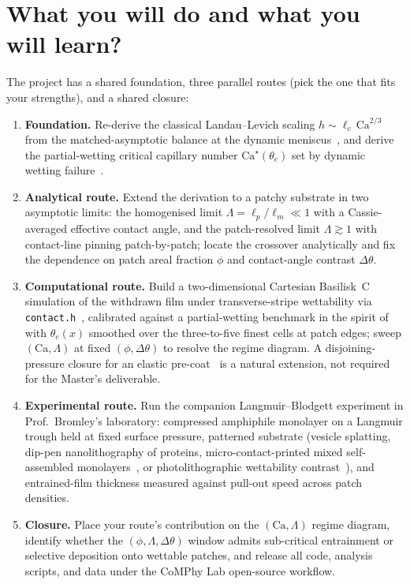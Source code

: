 \documentclass[11pt]{article}
\begin{document}
\section*{What you will do and what you will learn?}

\noindent The project has a shared foundation, three parallel routes (pick the one that fits your strengths), and a shared closure:

\begin{enumerate}
\itemsep0em
\item \textbf{Foundation.} Re-derive the classical Landau--Levich scaling $h \sim \ell_c \, \mathrm{Ca}^{2/3}$ from the matched-asymptotic balance at the dynamic meniscus~\citep{landauLevich1942,quere1999fluid}, and derive the partial-wetting critical capillary number $\mathrm{Ca}^\star(\theta_e)$ set by dynamic wetting failure~\citep{bonnWettingSpreading2009}.
\item \textbf{Analytical route.} Extend the derivation to a patchy substrate in two asymptotic limits: the homogenised limit $\Lambda = \ell_p / \ell_m \ll 1$ with a Cassie-averaged effective contact angle, and the patch-resolved limit $\Lambda \gtrsim 1$ with contact-line pinning patch-by-patch; locate the crossover analytically and fix the dependence on patch areal fraction $\phi$ and contact-angle contrast $\Delta\theta$.
\item \textbf{Computational route.} Build a two-dimensional Cartesian Basilisk~C simulation of the withdrawn film under transverse-stripe wettability via \texttt{contact.h}~\citep{popinet2015quadtree,basiliskVatsal,basiliskVatsalDropFilm}, calibrated against a partial-wetting benchmark in the spirit of~\citet{afkhami2009,afkhami2018} with $\theta_e(x)$ smoothed over the three-to-five finest cells at patch edges; sweep $(\mathrm{Ca}, \Lambda)$ at fixed $(\phi, \Delta\theta)$ to resolve the regime diagram. A disjoining-pressure closure for an elastic pre-coat~\citep{bertin2022} is a natural extension, not required for the Master's deliverable.
\item \textbf{Experimental route.} Run the companion Langmuir--Blodgett experiment in Prof.~Bromley's laboratory: compressed amphiphile monolayer on a Langmuir trough held at fixed surface pressure, patterned substrate (vesicle splatting, dip-pen nanolithography of proteins, micro-contact-printed mixed self-assembled monolayers~\citep{wilbur1994,mrksich1995}, or photolithographic wettability contrast~\citep{darhuber2000}), and entrained-film thickness measured against pull-out speed across patch densities.
\item \textbf{Closure.} Place your route's contribution on the $(\mathrm{Ca}, \Lambda)$ regime diagram, identify whether the $(\phi, \Lambda, \Delta\theta)$ window admits sub-critical entrainment or selective deposition onto wettable patches, and release all code, analysis scripts, and data under the CoMPhy Lab open-source workflow.
\end{enumerate}
\end{document}
